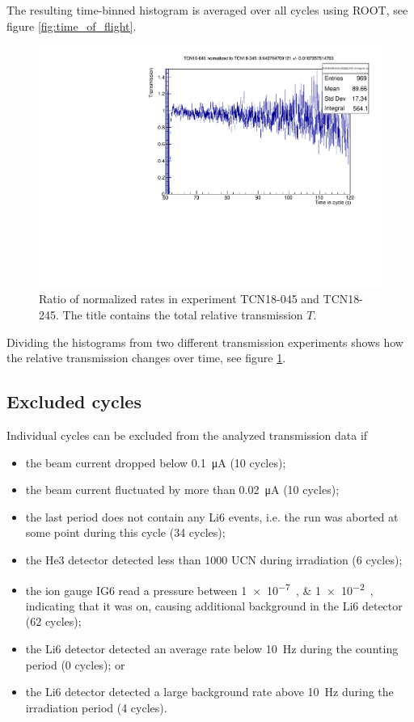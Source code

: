 \documentclass[10pt,letterpaper]{article}
\begin{document}
The resulting time-binned histogram is averaged over all cycles using ROOT, see figure \ref{fig:time_of_flight}.

\begin{figure}
\centering
\includegraphics[width=\textwidth,page=1]{../transmission/TCN18-045_TCN18-245.pdf}
\caption{Ratio of normalized rates in experiment TCN18-045 and TCN18-245. The title contains the total relative transmission $T$.}
\label{fig:time_of_flight_normalized}
\end{figure}

Dividing the histograms from two different transmission experiments shows how the relative transmission changes over time, see figure \ref{fig:time_of_flight_normalized}.

\subsection{Excluded cycles}

Individual cycles can be excluded from the analyzed transmission data if
\begin{itemize}
\item the beam current dropped below \SI{0.1}{\micro\ampere} (10 cycles);
\item the beam current fluctuated by more than \SI{0.02}{\micro\ampere} (10 cycles);
\item the last period does not contain any Li6 events, i.e. the run was aborted at some point during this cycle (34 cycles);
\item the He3 detector detected less than 1000 UCN during irradiation (6 cycles);
\item the ion gauge IG6 read a pressure between \SIlist{1e-7;1e-2}{\torr}, indicating that it was on, causing additional background in the Li6 detector (62 cycles);
\item the Li6 detector detected an average rate below \SI{10}{\hertz} during the counting period (0 cycles); or
\item the Li6 detector detected a large background rate above \SI{10}{\hertz} during the irradiation period (4 cycles).
\end{itemize}
\end{document}
